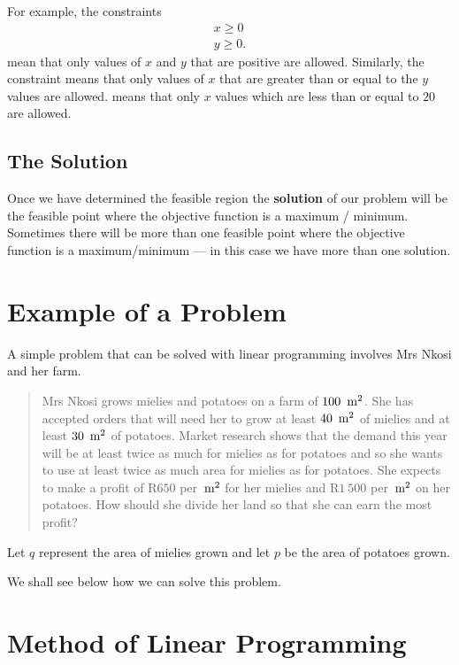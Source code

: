 For example, the constraints
\begin{eqnarray*}
x\geq 0\\
y\geq 0.
\end{eqnarray*}
mean that only values of $x$ and $y$ that are positive are allowed. Similarly, the constraint
means that only values of $x$ that are greater than or equal to the $y$ values are allowed.
means that only $x$ values which are less than or equal to $20$ are allowed.


\subsection{The Solution}


Once we have determined the feasible region the \textbf{solution} of our problem will be the feasible point where the objective function is a maximum / minimum. Sometimes there will be more than one feasible point where the objective function is a maximum/minimum --- in this case we have more than one solution. 

\section{Example of a Problem}
A simple problem that can be solved with linear programming involves Mrs Nkosi and her farm. 

\begin{quote}
Mrs Nkosi grows mielies and potatoes on a farm of $100~\,\rm{m}^2$. She has accepted orders that will need her to grow at least $40~\,\rm{m}^2$ of mielies and at least $30~\,\rm{m}^2$ of potatoes. Market research shows that the demand this year will be at least twice as much for mielies as for potatoes and so she wants to use at least twice as much area for mielies as for potatoes. She expects to make a profit of R$650$ per $\,\rm{m}^2$ for her mielies and R$1~500$ per $\,\rm{m}^2$ on her potatoes. How should she divide her land so that she can earn the most profit?
\end{quote}

Let $q$ represent the area of mielies grown and let $p$ be the area of potatoes grown. 

We shall see below how we can solve this problem.

\section{Method of Linear Programming}

